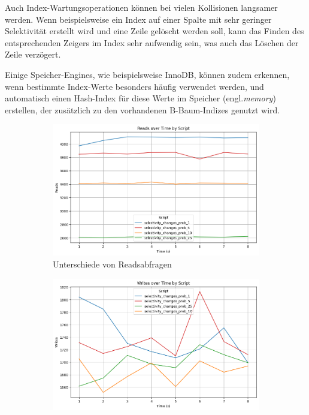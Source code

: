 Auch Index-Wartungsoperationen können bei vielen Kollisionen langsamer werden.
Wenn beispielsweise ein Index auf einer Spalte mit sehr geringer Selektivität erstellt wird und eine Zeile gelöscht werden soll, kann das Finden des entsprechenden Zeigers im Index sehr aufwendig sein, was auch das Löschen der Zeile verzögert.

Einige Speicher-Engines, wie beispielsweise InnoDB, können zudem erkennen, wenn bestimmte Index-Werte besonders häufig verwendet werden, und automatisch einen Hash-Index für diese Werte im Speicher (engl.\textit{memory}) erstellen, der zusätzlich zu den vorhandenen B-Baum-Indizes genutzt wird.

\begin{figure}[!ht]
    \centering
    \begin{subfigure}[t]{0.48\textwidth}
        \centering
        \includegraphics[width=\textwidth]{PNGs/Script/Index/Hash/selectivity-change/Reads}
        \caption[Hash - Kollisionen - Reads - Ergebnis]{Unterschiede von Readsabfragen}
        \label{hash-collision-reads}
    \end{subfigure}
    \hfill
    \begin{subfigure}[t]{0.48\textwidth}
        \centering
        \includegraphics[width=\textwidth]{PNGs/Script/Index/Hash/selectivity-change/Writes}

\end{subfigure}
\end{figure}

